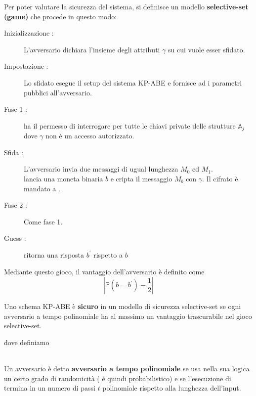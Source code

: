 \vspace{0.8cm}

Per poter valutare la sicurezza del sistema, si definisce un modello \textbf{selective-set (game)} che procede in questo modo:
\begin{description}
\item[Inizializzazione :] L'avversario  dichiara l'insieme degli attributi $\gamma$ su cui vuole esser sfidato.
\item[Impostazione :] Lo sfidato  esegue il setup del sistema KP-ABE e fornisce ad  i parametri pubblici all'avversario.
\item[Fase 1 :]  ha il permesso di interrogare  per tutte le chiavi private delle strutture $\mathbb{A}_j$ dove $\gamma$ non è un accesso autorizzato.
\item[Sfida :] L'avversario  invia due messaggi di ugual lunghezza $M_0$ ed $M_1$.\\
 lancia una moneta binaria $b$ e cripta il messaggio $M_b$ con $\gamma$. Il cifrato è mandato a .
\item[Fase 2 :] Come fase 1.
\item[Guess :]  ritorna una risposta $b^\prime$ rispetto a $b$
\end{description}
\vspace{0.2cm}

Mediante questo gioco, il vantaggio dell'avversario  è definito come \[\left\lvert \mathbb{P}(b = b^\prime) - \frac{1}{2}\right\rvert\]

\vspace{0.3cm}

\begin{defi}
Uno schema KP-ABE è \textbf{sicuro} in un modello di sicurezza selective-set se ogni avversario a tempo polinomiale ha al massimo un vantaggio trascurabile nel gioco selective-set.
\end{defi}

dove definiamo

\begin{defi} \cite[Def 1.2]{crittoalice}\\
Un avversario  è detto \textbf{avversario a tempo polinomiale} se usa nella sua logica un certo grado di randomicità ( è quindi probabilistico) e se l'esecuzione di  termina in un numero di passi $t$ polinomiale rispetto alla lunghezza dell'input. 
\end{defi}

